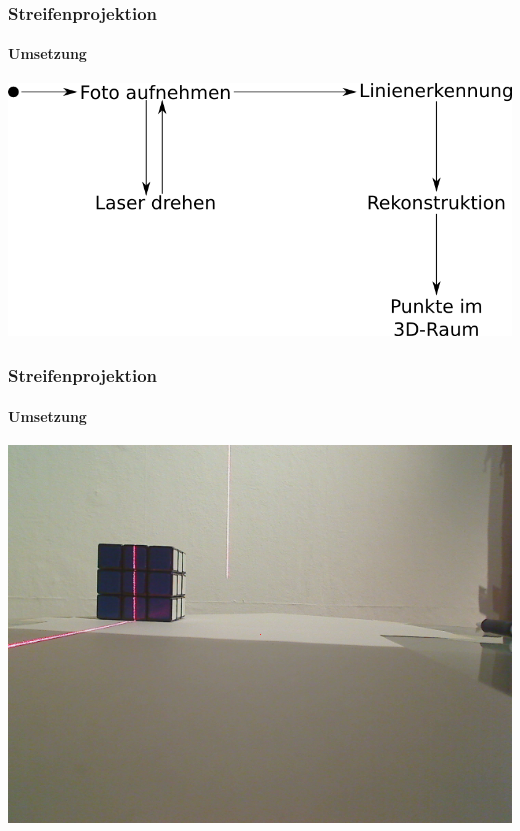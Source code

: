 \documentclass{beamer}
\begin{document}
\begin{frame}
	\frametitle{Streifenprojektion}
	\framesubtitle{Umsetzung}

	
	\includegraphics[width=\linewidth]{includes/blockbild.png}

\end{frame}
\begin{frame}
	\frametitle{Streifenprojektion}
	\framesubtitle{Umsetzung}

	
	\includegraphics[width=0.9\linewidth]{includes/cap.png}

\end{frame}
\end{document}
